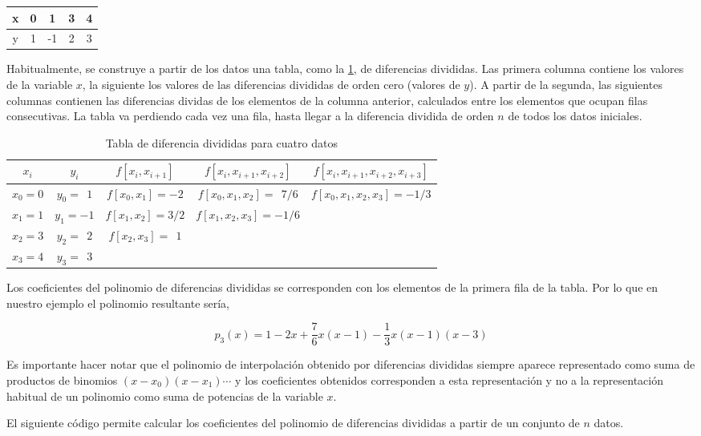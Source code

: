 \begin{table}[h]
\centering
\begin{tabular}{c|cccc}
x&0&1&3&4\\
\hline
y&1&-1&2&3
\end{tabular}
\end{table}
\begin{paracol}{2}
Habitualmente, se construye a partir de los datos una tabla, como la  \ref{tabdif}, de diferencias divididas. Las primera columna contiene los valores de la variable $x$, la siguiente los valores de las diferencias divididas de orden cero (valores de $y$). A partir de la segunda, las siguientes columnas contienen las diferencias dividas de los elementos de la columna anterior, calculados entre los elementos que ocupan filas consecutivas. La tabla va perdiendo cada vez una fila, hasta llegar a la diferencia dividida de orden $n$ de todos los datos iniciales.
\end{paracol}
\begin{table}[h]
\centering
\caption{Tabla de diferencia divididas para cuatro datos}
\begin{tabular}{ccccc}
$x_i$&$y_i$&$f\left[x_i,x_{i+1}\right]$&$f\left[x_i,x_{i+1},x_{i+2}\right]$&$f\left[x_i,x_{i+1},x_{i+2},x_{i+3}\right]$\\
\hline
$x_0=0$&$y_0=\ \  1$&$f\left[x_0,x_1\right]=-2$&$f\left[x_0,x_1,x_2\right]=\ \ 7/6$&$f\left[x_0,x_1,x_2,x_3\right]=-1/3$\\
$x_1=1$&$y_1=-1$&$f\left[x_1,x_2\right]=3/2$&$f\left[x_1,x_2,x_3\right]=-1/6$\\
$x_2=3$&$y_2=\ \ 2$&$f\left[x_2,x_3\right]=\ \ 1$\\
$x_3=4$&$y_3=\ \ 3$\\

\end{tabular}
\label{tabdif}
\end{table}
\begin{paracol}{2}
Los coeficientes del polinomio de diferencias divididas se corresponden con los elementos de la primera fila de la tabla. Por lo que en nuestro ejemplo el polinomio resultante sería,
\end{paracol}
\begin{equation*}
p_3(x)=1-2x+\frac{7}{6}x(x-1)-\frac{1}{3}x(x-1)(x-3)
\end{equation*}
\begin{paracol}{2}
Es importante hacer notar que el polinomio de interpolación obtenido por diferencias divididas siempre aparece representado como suma de productos de binomios $(x-x_0)(x-x_1)\cdots$ y los coeficientes obtenidos corresponden a esta representación y no a la representación habitual de un polinomio como suma de potencias de la variable $x$. 

El siguiente código permite calcular los coeficientes del polinomio de diferencias divididas a partir de un conjunto de $n$ datos.
\end{paracol}

